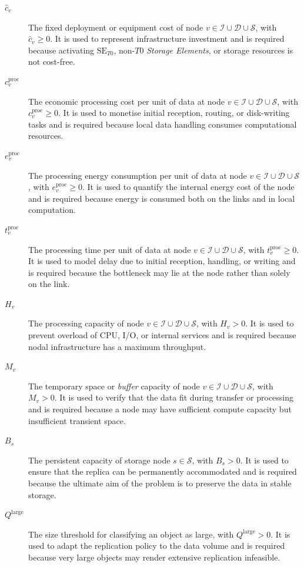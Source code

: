 \documentclass[a4paper,fleqn]{cas-dc}
\newcommand{\Iset}{\mathcal{I}}
\newcommand{\Dset}{\mathcal{D}}
\newcommand{\Sset}{\mathcal{S}}
\begin{document}
\begin{description}
\item[\(\hat c_v\)] The fixed deployment or equipment cost of node \(v\in\Iset\cup\Dset\cup\Sset\), with \(\hat c_v\ge 0\). It is used to represent infrastructure investment and is required because activating \(\mathrm{SE}_{T0}\), non-\(T0\) \emph{Storage Elements}, or storage resources is not cost-free. 

\item[\(c_v^{\mathrm{proc}}\)] The economic processing cost per unit of data at node \(v\in\Iset\cup\Dset\cup\Sset\), with \(c_v^{\mathrm{proc}}\ge 0\). It is used to monetise initial reception, routing, or disk-writing tasks and is required because local data handling consumes computational resources. 

\item[\(e_v^{\mathrm{proc}}\)] The processing energy consumption per unit of data at node \(v\in\Iset\cup\Dset\cup\Sset\), with \(e_v^{\mathrm{proc}}\ge 0\). It is used to quantify the internal energy cost of the node and is required because energy is consumed both on the links and in local computation. 

\item[\(t_v^{\mathrm{proc}}\)] The processing time per unit of data at node \(v\in\Iset\cup\Dset\cup\Sset\), with \(t_v^{\mathrm{proc}}\ge 0\). It is used to model delay due to initial reception, handling, or writing and is required because the bottleneck may lie at the node rather than solely on the link. 

\item[\(H_v\)] The processing capacity of node \(v\in\Iset\cup\Dset\cup\Sset\), with \(H_v>0\). It is used to prevent overload of CPU, I/O, or internal services and is required because nodal infrastructure has a maximum throughput. 

\item[\(M_v\)]  The temporary space or \emph{buffer} capacity of node \(v\in\Iset\cup\Dset\cup\Sset\), with \(M_v>0\). It is used to verify that the data fit during transfer or processing and is required because a node may have sufficient compute capacity but insufficient transient space. 

\item[\(B_s\)] The persistent capacity of storage node \(s\in\Sset\), with \(B_s>0\). It is used to ensure that the replica can be permanently accommodated and is required because the ultimate aim of the problem is to preserve the data in stable storage. 

\item[\(Q^{\mathrm{large}}\)] The size threshold for classifying an object as large, with \(Q^{\mathrm{large}}>0\). It is used to adapt the replication policy to the data volume and is required because very large objects may render extensive replication infeasible. 


\end{description}
\end{document}
